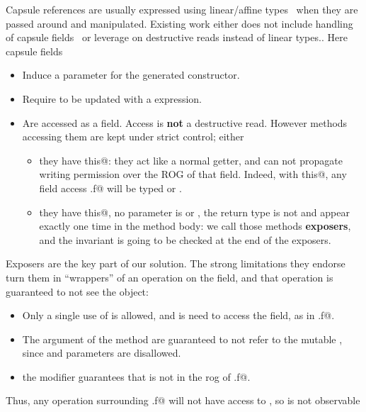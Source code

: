 Capsule references are usually expressed using linear/affine types~\cite{Boyland01} when they are passed around and manipulated.
Existing work 
either does not include handling of capsule fields~\cite{ServettoEtAl13a,ServettoZucca15}
or leverage on destructive reads instead of linear types.\cite{GordonEtAl12,clebsch2015deny}.
Here capsule fields 
\begin{itemize}
\item Induce a \Q@capsule@ parameter for the generated constructor.
\item Require to be updated with a \Q@capsule@ expression.
\item Are accessed as a \Q@mut@ field.
Access is \textbf{not} a destructive read.
 However methods accessing them are kept under
strict control; either
\begin{itemize}
\item they have \Q@read this@: they act like a normal getter, and can not propagate
writing permission over the ROG of that field.
Indeed, with \Q@read this@, any field access \Q@this.f@ will be typed \Q@read@ or \Q@imm@.
\item they have \Q@mut this@, no parameter is \Q@mut@ or \Q@read@,
the return type is not \Q@mut@ and \Q@this@ appear exactly one time in
the method body: we call those methods \textbf{exposers}, and the invariant is going to be checked at the end of
the exposers.
\end{itemize}
\end{itemize}
Exposers are the key part of our solution.
The strong limitations they endorse turn them in ``wrappers'' of an operation 
on the field, and that operation is guaranteed to not see the \Q@this@ object:
\begin{itemize}
\item Only a single use of \Q@this@ is allowed, and is need to access the field, as in \Q@this.f@.
\item The argument of the method are guaranteed to not refer to the mutable \Q@this@, since \Q@mut@ and \Q@read@
parameters are disallowed.
\item the \Q@capsule@ modifier guarantees that 
\Q@this@ is not in the rog of \Q@this.f@.
\end{itemize}
Thus, any operation surrounding \Q@this.f@ will not have access to \Q@this@, so \Q@this@ is not observable
